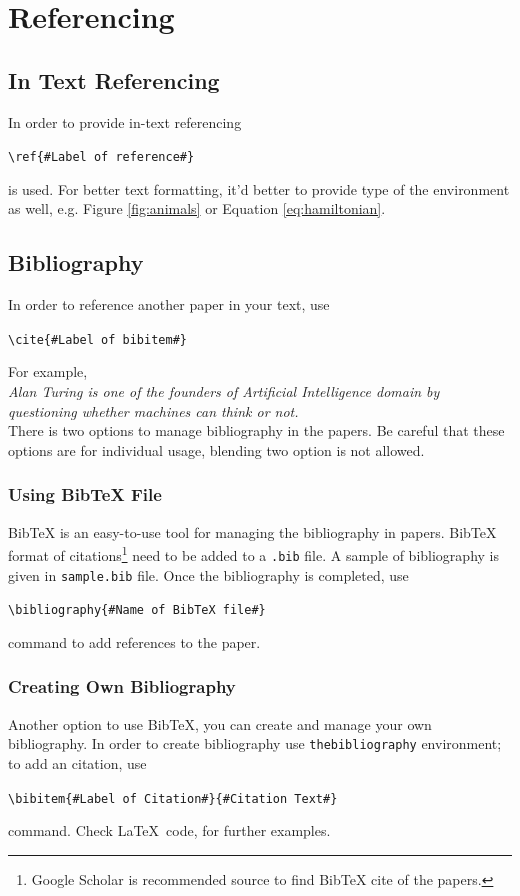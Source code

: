 \documentclass[a4paper,12pt]{article}
\newcommand{\writecommand}[2]{
    \begin{center}
        \texttt{\textbackslash #1\{\##2\#\}} \\
    \end{center}
}
\begin{document}
\section{Referencing}

\subsection{In Text Referencing \label{sec:in-text-ref}}
In order to provide in-text referencing \writecommand{ref}{Label of reference} is used. For better text formatting, it'd better to provide type of the environment as well, e.g. Figure \ref{fig:animals} or Equation \ref{eq:hamiltonian}.

\subsection{Bibliography}

In order to reference another paper in your text, use \writecommand{cite}{Label of bibitem} For example, 
\\[1\baselineskip]
\indent\textit{Alan Turing is one of the founders of Artificial Intelligence domain by questioning whether machines can think or not.\cite{turing2009computing}} \\[1\baselineskip] 
There is two options to manage bibliography in the papers. Be careful that these options are for individual usage, blending two option is not allowed. 

\subsubsection{Using BibTeX File}
BibTeX is an easy-to-use tool for managing the bibliography in papers. BibTeX format of citations\footnote{Google Scholar is recommended source to find BibTeX cite of the papers.} need to be added to a \texttt{.bib} file. A sample of bibliography is given in \texttt{sample.bib} file. Once the bibliography is completed, use \writecommand{bibliography}{Name of BibTeX file} command to add references to the paper.

\subsubsection{Creating Own Bibliography}
Another option to use BibTeX, you can create and manage your own bibliography. In order to create bibliography use \texttt{thebibliography} environment; to add an citation, use
\begin{center}
    \texttt{\textbackslash bibitem\{\#Label of Citation\#\}\{\#Citation Text\#\}} \\
\end{center}
command. Check \LaTeX~code, for further examples. 
\end{document}
